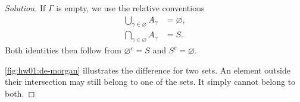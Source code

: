 \begin{proof}[Solution]
If $\Gamma$ is empty, we use the relative conventions
\[
  \begin{aligned}
    \bigcup_{\gamma\in\varnothing}A_\gamma&=\varnothing,\\
    \bigcap_{\gamma\in\varnothing}A_\gamma&=S.
  \end{aligned}
\]
Both identities then follow from $\varnothing^c=S$ and $S^c=\varnothing$.

\autoref{fig:hw01:de-morgan} illustrates the difference for two sets.
An element outside their intersection may still belong to one
of the sets. It simply cannot belong to both.
\end{proof}
